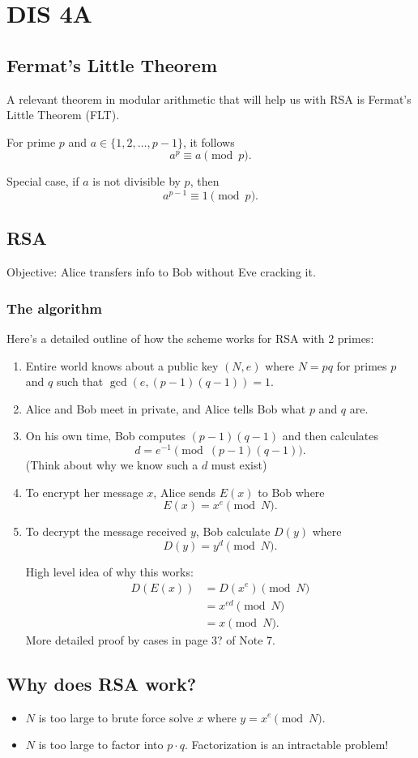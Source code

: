 \section{DIS 4A}

\subsection{Fermat's Little Theorem}

A relevant theorem in modular arithmetic that will help us with RSA is Fermat's Little Theorem (FLT).

\begin{theorem}
    For prime $p$ and $a \in \{1, 2, \ldots, p-1\}$, it follows \[ a^{p} \equiv a \pmod{p}. \]

    Special case, if $a$ is not divisible by $p$, then \[ a^{p-1} \equiv 1 \pmod{p}. \]
\end{theorem}

\subsection{RSA}
Objective: Alice transfers info to Bob without Eve cracking it. 
\subsubsection{The algorithm}
Here's a detailed outline of how the scheme works for RSA with 2 primes:
\begin{enumerate}
    \item Entire world knows about a public key $(N,e)$ where $N = pq$ for primes $p$ and $q$ such that $\gcd(e, (p-1)(q-1)) = 1.$
    \item Alice and Bob meet in private, and Alice tells Bob what $p$ and $q$ are.
    \item On his own time, Bob computes $(p-1)(q-1)$ and then calculates \[ d = e^{-1} \pmod{(p-1)(q-1)}. \] (Think about why we know such a $d$ must exist)
    \item To encrypt her message $x$, Alice sends $E(x)$ to Bob where \[ E(x) = x^{e} \pmod{N}. \]
    \item To decrypt the message received $y$, Bob calculate $D(y)$ where \[ D(y) = y^{d} \pmod{N}. \]
    
    High level idea of why this works: \begin{align*}
        D(E(x)) &= D(x^{e}) \pmod{N}\\
        &= x^{ed} \pmod{N} \\
        &= x \pmod{N}.
    \end{align*}
    More detailed proof by cases in page 3? of Note 7. 
\end{enumerate}

\subsection{Why does RSA work?}
\begin{itemize}
    \item $N$ is too large to brute force solve $x$ where $y = x^{e} \pmod{N}$. 
    \item $N$ is too large to factor into $p \cdot q$. Factorization is an intractable problem!
\end{itemize}